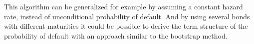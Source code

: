 This algorithm can be generalized for example by assuming a constant hazard rate, instead of unconditional probability of default. And by using several bonds with different maturities it could be possible to derive the term structure of the probability of default with an approach similar to the bootstrap method.

%
%
%
%
%

